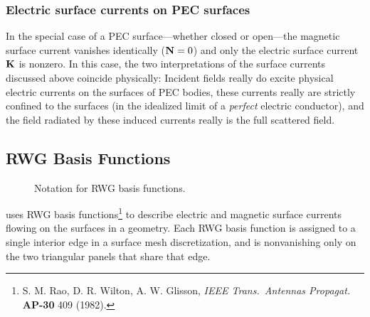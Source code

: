 \subsubsection*{Electric surface currents on PEC surfaces}

In the special case of a PEC surface---whether closed or
open---the magnetic surface current vanishes identically
($\mathbf{N}=0$) and only the electric surface current 
$\mathbf{K}$ is nonzero. In this case, the two interpretations of the 
surface currents discussed above coincide physically: 
Incident fields really do excite physical electric
currents on the surfaces of PEC bodies, these currents
really are strictly confined to the surfaces (in the
idealized limit of a \textit{perfect} electric conductor),
and the field radiated by these induced currents
really is the full scattered field.

\subsection*{RWG Basis Functions}
\begin{figure}
\begin{center}
\caption{Notation for RWG basis functions.}
\label{RWGNotationFigure}
\end{center}
\end{figure}

\lss uses RWG basis functions\footnote{S. M. Rao, D. R. Wilton, 
A. W. Glisson, \textit{IEEE Trans.\ Antennas Propagat.} 
\textbf{AP-30} 409 (1982).} to describe electric and magnetic 
surface currents flowing on the surfaces in a geometry. 
Each RWG basis function is assigned to a single interior
edge in a surface mesh discretization, and is nonvanishing
only on the two triangular panels that share that 
edge. 

